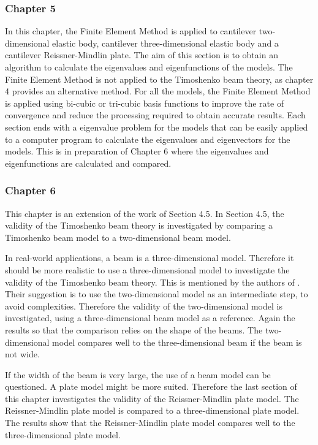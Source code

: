 \documentclass[../main.tex]{subfiles}
\begin{document}
\subsubsection{Chapter 5}
In this chapter, the Finite Element Method is applied to cantilever two-dimensional elastic body, cantilever three-dimensional elastic body and a cantilever Reissner-Mindlin plate. The aim of this section is to obtain an algorithm to calculate the eigenvalues and eigenfunctions of the models. The Finite Element Method is not applied to the Timoshenko beam theory, as chapter 4 provides an alternative method. For all the models, the Finite Element Method is applied using bi-cubic or tri-cubic basis functions to improve the rate of convergence and reduce the processing required to obtain accurate results. Each section ends with a eigenvalue problem for the models that can be easily applied to a computer program to calculate the eigenvalues and eigenvectors for the models. This is in preparation of Chapter 6 where the eigenvalues and eigenfunctions are calculated and compared.

\subsubsection{Chapter 6}
This chapter is an extension of the work of Section 4.5. In Section 4.5, the validity of the Timoshenko beam theory is investigated by comparing a Timoshenko beam model to a two-dimensional beam model. 

In real-world applications, a beam is a three-dimensional model. Therefore it should be more realistic to use a three-dimensional model to investigate the validity of the Timoshenko beam theory. This is mentioned by the authors of \cite{LVV09}. Their suggestion is to use the two-dimensional model as an intermediate step, to avoid complexities. Therefore the validity of the two-dimensional model is investigated, using a three-dimensional beam model as a reference. Again the results so that the comparison relies on the shape of the beams. The two-dimensional model compares well to the three-dimensional beam if the beam is not wide. 

If the width of the beam is very large, the use of a beam model can be questioned. A plate model might be more suited. Therefore the last section of this chapter investigates the validity of the Reissner-Mindlin plate model. The Reissner-Mindlin plate model is compared to a three-dimensional plate model. The results show that the Reissner-Mindlin plate model compares well to the three-dimensional plate model.
\end{document}
